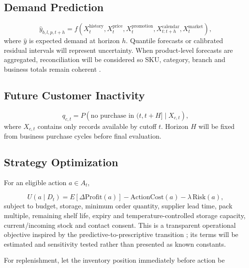 \subsection{Demand Prediction}

\begin{equation}
\hat{y}_{b,l,p,t+h}=f\!\left(X^{\mathrm{history}}_{t},X^{\mathrm{price}}_{t},
X^{\mathrm{promotion}}_{t},X^{\mathrm{calendar}}_{t:t+h},
X^{\mathrm{market}}_{t}\right),
\label{eq:demand}
\end{equation}
where $\hat{y}$ is expected demand at horizon $h$. Quantile forecasts or
calibrated residual intervals will represent uncertainty. When product-level
forecasts are aggregated, reconciliation will be considered so SKU, category,
branch and business totals remain coherent \cite{hyndman2011hierarchical}.

\subsection{Future Customer Inactivity}

\begin{equation}
q_{c,t}=P\!\left(\text{no purchase in }(t,t+H]\mid X_{c,t}\right),
\label{eq:churn}
\end{equation}
where $X_{c,t}$ contains only records available by cutoff $t$. Horizon $H$ will
be fixed from business purchase cycles before final evaluation.

\subsection{Strategy Optimization}

For an eligible action $a\in A_t$,

\begin{equation}
U(a\mid D_t)=E[\Delta\mathrm{Profit}(a)]-\mathrm{ActionCost}(a)
-\lambda\,\mathrm{Risk}(a),
\label{eq:utility}
\end{equation}
subject to budget, storage, minimum order quantity, supplier lead time,
pack multiple, remaining shelf life, expiry and temperature-controlled storage capacity,
current/incoming stock and contact consent. This is a transparent operational
objective inspired by the predictive-to-prescriptive transition
\cite{bertsimas2020prescriptive}; its terms will be estimated and sensitivity
tested rather than presented as known constants.

For replenishment, let the inventory position immediately before action be

